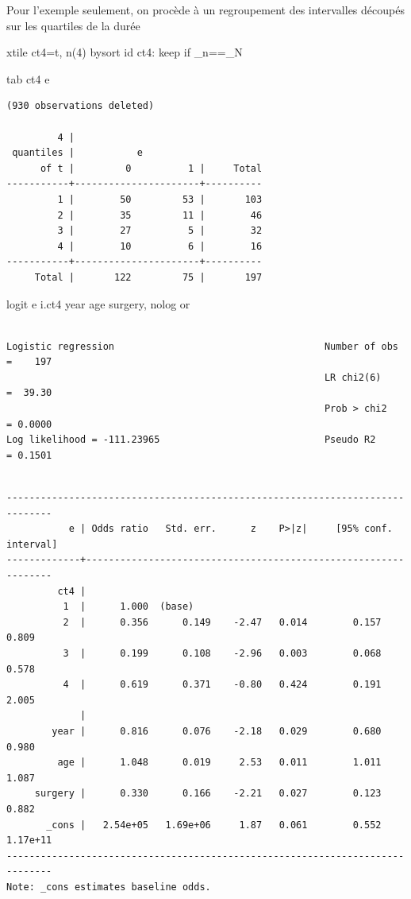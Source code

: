 \documentclass[
  12pt,
  letterpaper,
  DIV=11,
  numbers=noendperiod,
  onepage,
  openany]{scrreprt}
\newenvironment{Shaded}{\begin{snugshade}}{\end{snugshade}}
\newcommand{\DataTypeTok}[1]{\textcolor[rgb]{0.87,0.87,0.75}{#1}}
\newcommand{\FunctionTok}[1]{\textcolor[rgb]{0.94,0.94,0.56}{#1}}
\newcommand{\KeywordTok}[1]{\textcolor[rgb]{0.94,0.87,0.69}{#1}}
\newcommand{\NormalTok}[1]{\textcolor[rgb]{0.80,0.80,0.80}{#1}}
\begin{document}
Pour l'exemple seulement, on procède à un regroupement des intervalles
découpés sur les quartiles de la durée

\begin{Shaded}
\begin{Highlighting}[]
\KeywordTok{xtile}\NormalTok{ ct4=t, n(4)}
\KeywordTok{bysort}\NormalTok{ id ct4: }\KeywordTok{keep} \KeywordTok{if} \DataTypeTok{\_n}\NormalTok{==\_N}

\KeywordTok{tab}\NormalTok{  ct4 }\FunctionTok{e}
\end{Highlighting}
\end{Shaded}

\begin{verbatim}
(930 observations deleted)

         4 |
 quantiles |           e
      of t |         0          1 |     Total
-----------+----------------------+----------
         1 |        50         53 |       103 
         2 |        35         11 |        46 
         3 |        27          5 |        32 
         4 |        10          6 |        16 
-----------+----------------------+----------
     Total |       122         75 |       197 
\end{verbatim}

\begin{Shaded}
\begin{Highlighting}[]
\KeywordTok{logit} \FunctionTok{e}\NormalTok{ i.ct4  }\FunctionTok{year}\NormalTok{ age surgery,  }\KeywordTok{nolog} \KeywordTok{or}
\end{Highlighting}
\end{Shaded}

\begin{verbatim}

Logistic regression                                     Number of obs =    197
                                                        LR chi2(6)    =  39.30
                                                        Prob > chi2   = 0.0000
Log likelihood = -111.23965                             Pseudo R2     = 0.1501
\end{verbatim}

\begin{verbatim}

------------------------------------------------------------------------------
           e | Odds ratio   Std. err.      z    P>|z|     [95% conf. interval]
-------------+----------------------------------------------------------------
         ct4 |
          1  |      1.000  (base)
          2  |      0.356      0.149    -2.47   0.014        0.157       0.809
          3  |      0.199      0.108    -2.96   0.003        0.068       0.578
          4  |      0.619      0.371    -0.80   0.424        0.191       2.005
             |
        year |      0.816      0.076    -2.18   0.029        0.680       0.980
         age |      1.048      0.019     2.53   0.011        1.011       1.087
     surgery |      0.330      0.166    -2.21   0.027        0.123       0.882
       _cons |   2.54e+05   1.69e+06     1.87   0.061        0.552    1.17e+11
------------------------------------------------------------------------------
Note: _cons estimates baseline odds.
\end{verbatim}
\end{document}
